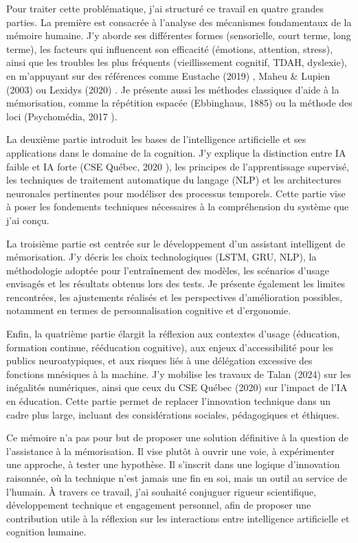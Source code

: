 \documentclass[11pt,a4paper]{report}
\begin{document}
Pour traiter cette problématique, j’ai structuré ce travail en quatre grandes parties. La première est consacrée à l’analyse des mécanismes fondamentaux de la mémoire humaine. J’y aborde ses différentes formes (sensorielle, court terme, long terme), les facteurs qui influencent son efficacité (émotions, attention, stress), ainsi que les troubles les plus fréquents (vieillissement cognitif, TDAH, dyslexie), en m’appuyant sur des références comme Eustache (2019) \cite{inserm}, Maheu \& Lupien (2003) \cite{maheulupienn} ou Lexidys (2020) \cite{lexidys}. Je présente aussi les méthodes classiques d’aide à la mémorisation, comme la répétition espacée (Ebbinghaus, 1885) ou la méthode des loci (Psychomédia, 2017 \cite{psychomédia}).

La deuxième partie introduit les bases de l’intelligence artificielle et ses applications dans le domaine de la cognition. J’y explique la distinction entre IA faible et IA forte (CSE Québec, 2020 \cite{hypotheses}), les principes de l’apprentissage supervisé, les techniques de traitement automatique du langage (NLP) et les architectures neuronales pertinentes pour modéliser des processus temporels. Cette partie vise à poser les fondements techniques nécessaires à la compréhension du système que j’ai conçu.

La troisième partie est centrée sur le développement d’un assistant intelligent de mémorisation. J’y décris les choix technologiques (LSTM, GRU, NLP), la méthodologie adoptée pour l’entraînement des modèles, les scénarios d’usage envisagés et les résultats obtenus lors des tests. Je présente également les limites rencontrées, les ajustements réalisés et les perspectives d’amélioration possibles, notamment en termes de personnalisation cognitive et d’ergonomie.

Enfin, la quatrième partie élargit la réflexion aux contextes d’usage (éducation, formation continue, rééducation cognitive), aux enjeux d’accessibilité pour les publics neuroatypiques, et aux risques liés à une délégation excessive des fonctions mnésiques à la machine. J’y mobilise les travaux de Talan (2024) \cite{talan} sur les inégalités numériques, ainsi que ceux du CSE Québec (2020) \cite{hypotheses} sur l’impact de l’IA en éducation. Cette partie permet de replacer l’innovation technique dans un cadre plus large, incluant des considérations sociales, pédagogiques et éthiques.

Ce mémoire n’a pas pour but de proposer une solution définitive à la question de l’assistance à la mémorisation. Il vise plutôt à ouvrir une voie, à expérimenter une approche, à tester une hypothèse. Il s’inscrit dans une logique d’innovation raisonnée, où la technique n’est jamais une fin en soi, mais un outil au service de l’humain. À travers ce travail, j’ai souhaité conjuguer rigueur scientifique, développement technique et engagement personnel, afin de proposer une contribution utile à la réflexion sur les interactions entre intelligence artificielle et cognition humaine.
\end{document}
